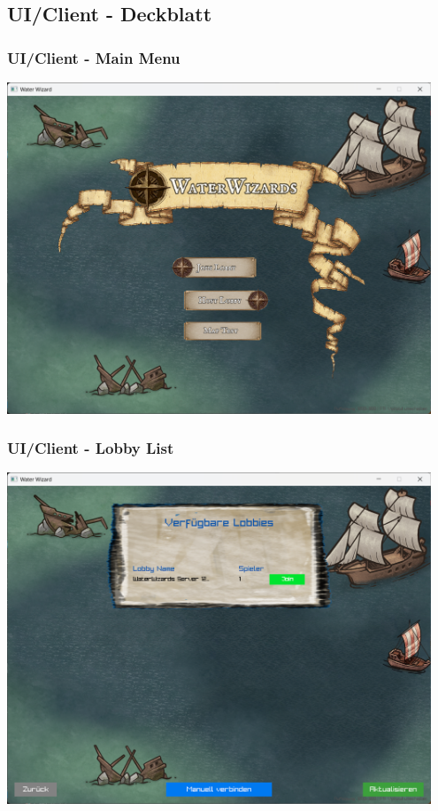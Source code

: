 \documentclass{beamer}
\begin{document}
\subsection{UI/Client - Deckblatt}
\begin{frame}
  \frametitle{UI/Client - Main Menu}
  \includegraphics[width=0.95\textwidth]{MainMenuScreen.png}
\end{frame}

\begin{frame}
  \frametitle{UI/Client - Lobby List}
  \includegraphics[width=0.95\textwidth]{LobbyListScreen.png}
\end{frame}
\end{document}
